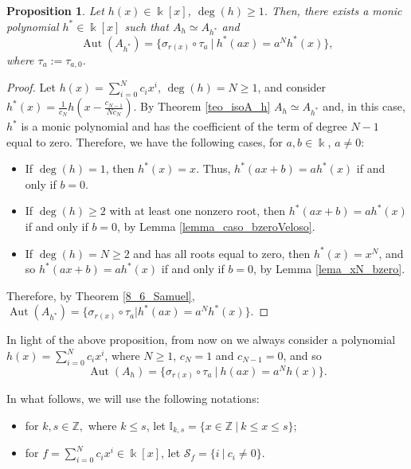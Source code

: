 \documentclass{article}
\numberwithin{equation}{section}\theoremstyle{plain}
\newtheorem{proposition}[theorem]{Proposition}
\newcommand\I{\mathbb I}
\DeclareMathOperator{\Aut}{Aut}
\begin{document}
\begin{proposition}
    Let $h(x)\in \Bbbk[x]$, $\deg(h)\geq 1$.  Then, there exists a monic polynomial $h^*\in \Bbbk[x]$ such that $A_h\simeq A_{h^*}$ and 
    $$\Aut(A_{h^*})=\{\sigma_{r(x)}\circ\tau_{a} \ | \ h^*(ax)=a^Nh^*(x)\},$$
where $\tau_a := \tau_{a,0}$.
\end{proposition}
\begin{proof} Let $h(x)=\sum_{i=0}^{N}c_ix^i$, $\deg(h)=N\geq 1$, and consider
     $h^*(x)=\frac{1}{c_N}h(x-\frac{c_{N-1}}{N c_N})$. By Theorem  \ref{teo_isoA_h} $A_h\simeq A_{h^*}$ and, in this case, $h^*$ is a monic polynomial and has the coefficient of the term of degree $N-1$ equal to zero. Therefore, we have the following cases, for $a,b\in\Bbbk$, $a\neq 0$:
\begin{itemize}
    \item[i)] If $\deg(h)=1$, then $h^*(x)=x$. Thus, $h^*(ax+b)=ah^*(x)$ if and only if $b=0$.

    \item[ii)] If $\deg(h)\geq 2$ with at least one nonzero root, then $h^*(ax+b)=ah^*(x)$ if and only if $b=0$, by Lemma  \ref{lemma_caso_bzeroVeloso}.

     \item[iii)] If $\deg(h)=N\geq 2$ and has all roots equal to zero, then $h^*(x)=x^N$, and so $h^*(ax+b)=ah^*(x)$ if and only if $b=0$, by Lemma \ref{lema_xN_bzero}.
\end{itemize}

     Therefore, by Theorem \ref{8_6_Samuel}, 
     $\Aut(A_{h^*})=\{\sigma_{r(x)}\circ\tau_{a}| h^*(ax)=a^Nh^*(x)\}.$
\end{proof}

\medbreak 

In light of the above proposition, from now on we always consider a polynomial $h(x)=\sum_{i=0}^N c_i x^i$, where $N \geq 1$, $c_N=1$ and $c_{N-1}=0$, and so 
\begin{equation}\label{aut_Ah}
    \Aut(A_{h})=\{\sigma_{r(x)}\circ\tau_{a} \ | \ h(ax)=a^Nh(x)\}.
\end{equation}

\medbreak

In what follows, we will use the following notations:
\begin{itemize}
    \item for $k, s \in \mathbb{Z},$ where $k \leq s$, let $\I_{k,s} = \{ x \in \mathbb{Z} \ | \ k \leq x \leq s\}$;
    \item for $f=\sum_{i=0}^{N}c_ix^i\in \Bbbk[x]$, let $\mathcal{S}_f = \{ i \ | \ c_i \neq 0\}$.
\end{itemize}
\end{document}
